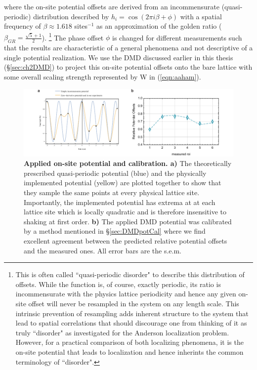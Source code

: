 where the on-site potential offsets are derived from an incommensurate (quasi-periodic) distribution described by $h_i = \cos{\left ( 2 \pi i \beta + \phi \right )} $ with a spatial frequency of $\beta \approx 1.618$ sites${^{-1}}$ as an approximation of the golden ratio ($\beta_{GR} = \frac{\sqrt{5}+1}{2}$). \footnote{This is often called ``quasi-periodic disorder" to describe this distribution of offsets. While the function is, of course, exactly periodic, its ratio is incommensurate with the physics lattice periodicity and hence any given on-site offset will never be resampled in the system on any length scale. This intrinsic prevention of resampling adds inherent structure to the system that lead to spatial correlations that should discourage one from thinking of it as truly ``disorder" as investigated for the Anderson localization problem. However, for a practical comparison of both localizing phenomena, it is the on-site potential that leads to localization and hence inherints the common terminology of ``disorder".} The phase offset $\phi$ is changed for different measurements such that the results are characteristic of a general phenomena and not descriptive of a single potential realization. We use the DMD discussed earlier in this thesis (\S \ref{sec:ch2DMD}) to project this on-site potential offsets onto the bare lattice with some overall scaling strength represented by W in (\ref{eqn:aaham}). 

\begin{figure}[t!]
		\includegraphics[width=\columnwidth]{figures/ch5/combo_disorder.pdf} 
		\caption{\textbf{Applied on-site potential and calibration. a)} The theoretically prescribed quasi-periodic potential (blue) and the physically implemented potential (yellow) are plotted together to show that they sample the same points at every physical lattice site. Importantly, the implemented potential has extrema at at each lattice site which is locally quadratic and is therefore insensitive to shaking at first order. \textbf{b)} The applied DMD potential was calibrated by a method mentioned in \S \ref{sec:DMDpotCal} where we find excellent agreement between the predicted relative potential offsets and the measured ones. All error bars are the s.e.m.}
		\label{fig:comboDisorder}	
\end{figure}

